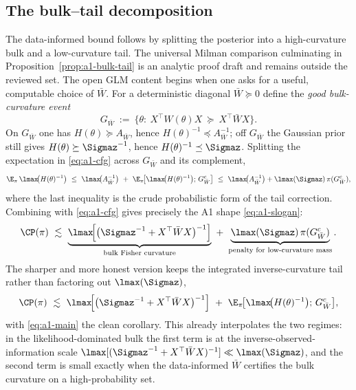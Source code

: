 \documentclass[../../main.tex]{subfiles}
\begin{document}
\subsection{The bulk--tail decomposition}
\label{subsec:a1-bulktail}

The data-informed bound follows by splitting the posterior into a high-curvature bulk and a
low-curvature tail. The universal Milman comparison culminating in
Proposition~\ref{prop:a1-bulk-tail} is an analytic proof draft and remains outside the reviewed set.
The open GLM content begins when one asks for a useful, computable choice of $\bar W$.
For a deterministic diagonal $\bar W\succeq0$ define the \emph{good
bulk-curvature event}
\begin{equation}\label{eq:a1-good}
  G_{\bar W}\ :=\ \big\{\theta:\ X^\top W(\theta)X\ \succeq\ X^\top\bar W X\big\}.
\end{equation}
On $G_{\bar W}$ one has $H(\theta)\succeq A_{\bar W}$, hence $H(\theta)^{-1}\preceq A_{\bar
W}^{-1}$; off $G_{\bar W}$ the Gaussian prior still gives $H(\theta)\succeq\Sigmaz^{-1}$, hence
$H(\theta)^{-1}\preceq\Sigmaz$. Splitting the expectation in \eqref{eq:a1-cfg} across $G_{\bar W}$
and its complement,
\begin{equation}\label{eq:a1-split}
  \E_\pi\,\lmax\!\big(H(\theta)^{-1}\big)
  \ \le\ \lmax\!\big(A_{\bar W}^{-1}\big)
  \ +\ \E_\pi\!\big[\lmax\!\big(H(\theta)^{-1}\big);\,G_{\bar W}^c\big]
  \ \le\ \lmax\!\big(A_{\bar W}^{-1}\big)+\lmax(\Sigmaz)\,\pi(G_{\bar W}^c),
\end{equation}
where the last inequality is the crude probabilistic form of the tail correction. Combining with
\eqref{eq:a1-cfg} gives precisely the A1 shape \eqref{eq:a1-slogan}:
\begin{equation}\label{eq:a1-main}
  \CP(\pi)\ \lesssim\
  \underbrace{\lmax\!\Big[\big(\Sigmaz^{-1}+X^\top\bar W X\big)^{-1}\Big]}_{\text{bulk Fisher curvature}}
  \ +\
  \underbrace{\lmax(\Sigmaz)\,\pi(G_{\bar W}^c)}_{\text{penalty for low-curvature mass}} .
\end{equation}
The sharper and more honest version keeps the integrated inverse-curvature tail rather than
factoring out $\lmax(\Sigmaz)$,
\begin{equation}\label{eq:a1-main-sharp}
  \CP(\pi)\ \lesssim\ \lmax\!\Big[\big(\Sigmaz^{-1}+X^\top\bar W X\big)^{-1}\Big]
  \ +\ \E_\pi\!\big[\lmax\!\big(H(\theta)^{-1}\big);\,G_{\bar W}^c\big],
\end{equation}
with \eqref{eq:a1-main} the clean corollary. This already interpolates the two regimes: in the
likelihood-dominated bulk the first term is at the inverse-observed-information scale
$\lmax[(\Sigmaz^{-1}+X^\top\bar W X)^{-1}]\ll\lmax(\Sigmaz)$, and the second term is small exactly
when the data-informed $\bar W$ certifies the bulk curvature on a high-probability set.
\end{document}
